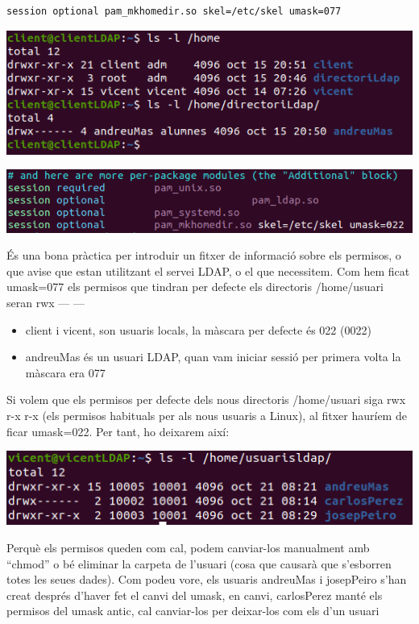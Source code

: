 \documentclass[
  12 pt,
  a4paper,
]{article}
\begin{document}
\begin{verbatim}
session optional pam_mkhomedir.so skel=/etc/skel umask=077
\end{verbatim}

\includegraphics{png/libpam9.png}

\includegraphics{png/libpam10.png}

És una bona pràctica per introduir un fitxer de informació sobre els
permisos, o que avise que estan utilitzant el servei LDAP, o el que
necessitem. Com hem ficat umask=077 els permisos que tindran per defecte
els directoris /home/usuari seran rwx --- ---

\begin{itemize}
\item
  client i vicent, son usuaris locals, la màscara per defecte és 022
  (0022)
\item
  andreuMas és un usuari LDAP, quan vam iniciar sessió per primera volta
  la màscara era 077
\end{itemize}

Si volem que els permisos per defecte dels nous directoris /home/usuari
siga rwx r-x r-x (els permisos habituals per als nous usuaris a Linux),
al fitxer hauríem de ficar umask=022. Per tant, ho deixarem així:

\includegraphics{png/libpam11.png}

Perquè els permisos queden com cal, podem canviar-los manualment amb
``chmod'' o bé eliminar la carpeta de l'usuari (cosa que causarà que
s'esborren totes les seues dades). Com podeu vore, els usuaris andreuMas
i josepPeiro s'han creat després d'haver fet el canvi del umask, en
canvi, carlosPerez manté els permisos del umask antic, cal canviar-los
per deixar-los com els d'un usuari
\end{document}
